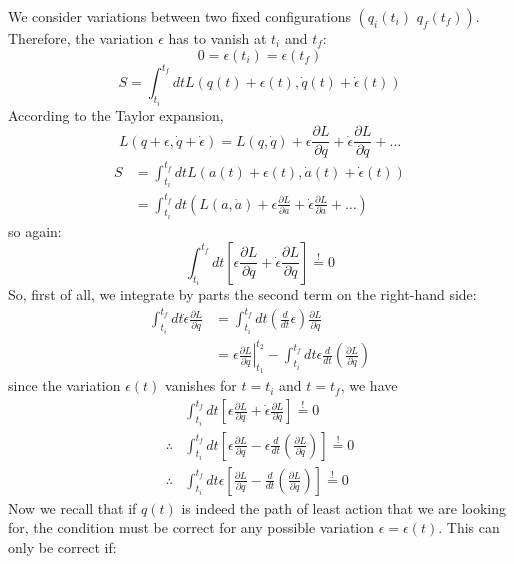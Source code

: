 We consider variations between two fixed configurations $\left(q_{i}\left(t_{i}\right)\right.$ $\left.q_{f}\left(t_{f}\right)\right) .$ Therefore, the variation $\epsilon$ has to vanish at $t_{i}$ and $t_{f}:$
$$
0=\epsilon\left(t_{i}\right)=\epsilon\left(t_{f}\right)
$$
$$
S=\int_{t_{i}}^{t_{f}} d t L(q(t)+\epsilon(t), \dot{q}(t)+\dot{\epsilon}(t))
$$
According to the Taylor expansion,
$$
L(q+\epsilon, \dot{q}+\dot{\epsilon})=L(q, \dot{q})+\epsilon \frac{\partial L}{\partial q}+\dot{\epsilon} \frac{\partial L}{\partial \dot{q}}+\ldots
$$
$$
\begin{aligned}
S &=\int_{t_{i}}^{t_{f}} d t L(a(t)+\epsilon(t), \dot{a}(t)+\dot{\epsilon}(t)) \\
&=\int_{t_{i}}^{t_{f}} d t\left(L(a, \dot{a})+\epsilon \frac{\partial L}{\partial a}+\dot{\epsilon} \frac{\partial L}{\partial \dot{a}}+\ldots\right)
\end{aligned}
$$
 so again:
$$
\int_{t_{i}}^{t_{f}} d t\left[\epsilon \frac{\partial L}{\partial q}+\dot{\epsilon} \frac{\partial L}{\partial \dot{q}}\right] \stackrel{!}{=} 0
$$
So, first of all, we integrate by parts the second term on the right-hand side:
$$
\begin{aligned}
\int_{t_{i}}^{t_{f}} d t \dot{\epsilon} \frac{\partial L}{\partial \dot{q}} &=\int_{t_{i}}^{t_{f}} d t\left(\frac{d}{d t} \epsilon\right) \frac{\partial L}{\partial \dot{q}} \\
&=\left.\epsilon \frac{\partial L}{\partial \dot{q}}\right|_{t_{1}} ^{t_{2}}-\int_{t_{i}}^{t_{f}} d t \epsilon \frac{d}{d t}\left(\frac{\partial L}{\partial \dot{q}}\right)
\end{aligned}
$$
since the variation $\epsilon(t)$ vanishes for $t=t_{i}$ and $t=t_{f}$, we have
$$
\begin{aligned}
& \int_{t_{i}}^{t_{f}} d t\left[\epsilon \frac{\partial L}{\partial q}+\dot{\epsilon} \frac{\partial L}{\partial \dot{q}}\right] \stackrel{!}{=} 0 \\
\therefore & \int_{t_{i}}^{t_{f}} d t\left[\epsilon \frac{\partial L}{\partial q}-\epsilon \frac{d}{d t}\left(\frac{\partial L}{\partial \dot{q}}\right)\right] \stackrel{!}{=} 0 \\
\therefore & \int_{t_{i}}^{t_{f}} d t \epsilon\left[\frac{\partial L}{\partial q}-\frac{d}{d t}\left(\frac{\partial L}{\partial \dot{q}}\right)\right] \stackrel{!}{=} 0
\end{aligned}
$$
Now we recall that if $q(t)$ is indeed the path of least action that we are looking for, the condition must be correct for any possible variation $\epsilon=\epsilon(t)$. This can only be correct if:
